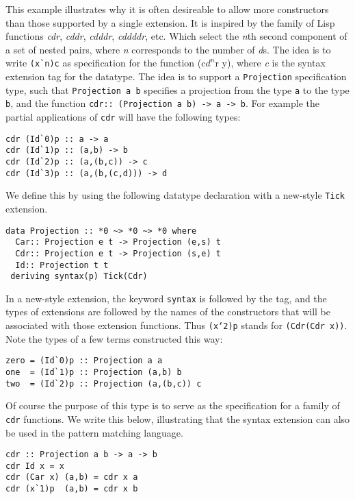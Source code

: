 \documentclass[11pt,twoside]{article}
\begin{document}
This example illustrates why it is often desireable to allow more constructors than those supported by a
single extension. It is inspired by the family of Lisp functions {\it cdr}, {\it cddr}, {\it cdddr}, {\it
cddddr}, etc. Which select the {\it n}th second component of a set of nested pairs, where {\it n}
corresponds to the number of {\it d}s. The idea is to write \verb+(x`n)c+ as specification
for the function (c$d^n$r y), where {\it c}
is the syntax extension tag for the datatype. The idea is to support a {\tt Projection}
specification type, such that {\tt Projection a b} specifies a projection from the type {\tt a}
to the type {\tt b}, and the function {\tt cdr:: (Projection a b) -> a -> b}. For
example the partial applications of {\tt cdr} will have the following types:

\begin{verbatim}
cdr (Id`0)p :: a -> a
cdr (Id`1)p :: (a,b) -> b
cdr (Id`2)p :: (a,(b,c)) -> c
cdr (Id`3)p :: (a,(b,(c,d))) -> d
\end{verbatim}

We define this by using the following datatype declaration with a new-style {\tt Tick}
extension.

\begin{verbatim}
data Projection :: *0 ~> *0 ~> *0 where
  Car:: Projection e t -> Projection (e,s) t
  Cdr:: Projection e t -> Projection (s,e) t
  Id:: Projection t t
 deriving syntax(p) Tick(Cdr)
\end{verbatim}

In a new-style extension, the keyword {\tt syntax} is followed by the tag, and the
types of extensions are followed by the names of the constructors that will be associated
with those extension functions. Thus {\tt (x`2)p} stands for {\tt (Cdr(Cdr x))}.
Note the types of a few terms constructed this way:

\begin{verbatim}
zero = (Id`0)p :: Projection a a
one  = (Id`1)p :: Projection (a,b) b
two  = (Id`2)p :: Projection (a,(b,c)) c
\end{verbatim}

Of course the purpose of this type is to serve as the specification for a family
of {\tt cdr} functions. We write this below, illustrating that the syntax extension
can also be used in the pattern matching language.

\begin{verbatim}
cdr :: Projection a b -> a -> b
cdr Id x = x
cdr (Car x) (a,b) = cdr x a
cdr (x`1)p  (a,b) = cdr x b
\end{verbatim}
\end{document}
